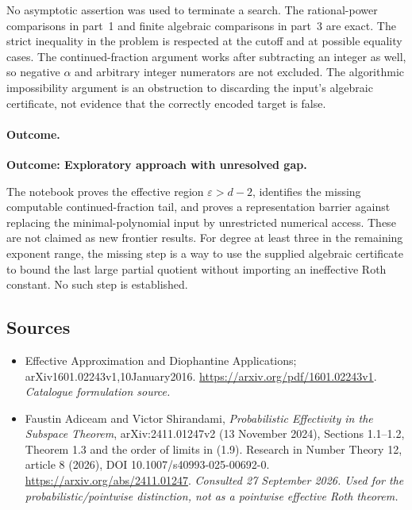 \documentclass[11pt,a4paper]{article}
\newcommand{\eps}{\varepsilon}
\begin{document}
No asymptotic assertion was used to terminate a search. The rational-power
comparisons in part~1 and finite algebraic comparisons in part~3 are exact.
The strict inequality in the problem is respected at the cutoff and at
possible equality cases. The continued-fraction argument works after
subtracting an integer as well, so negative $\alpha$ and arbitrary integer
numerators are not excluded. The algorithmic impossibility argument is an
obstruction to discarding the input's algebraic certificate, not evidence
that the correctly encoded target is false.

\paragraph{Outcome.}
\textbf{Outcome: Exploratory approach with unresolved gap.}

The notebook proves the effective region $\eps>d-2$, identifies the missing
computable continued-fraction tail, and proves a representation barrier
against replacing the minimal-polynomial input by unrestricted numerical
access. These are not claimed as new frontier results. For degree at least
three in the remaining exponent range, the missing step is a way to use
the supplied algebraic certificate to bound the last large partial quotient
without importing an ineffective Roth constant. No such step is established.
\subsection{Sources}
\begin{itemize}\raggedright
\item[\textnormal{[S1]}]\hypertarget{source:208:1}{} Effective Approximation and Diophantine Applications; arXiv1601.02243v1,10January2016.
\url{https://arxiv.org/pdf/1601.02243v1}.
{\small\textit{Catalogue formulation source.}}
\item[\textnormal{[E1]}]\hypertarget{extra:208:1}{} Faustin Adiceam and Victor Shirandami,
\emph{Probabilistic Effectivity in the Subspace Theorem},
arXiv:2411.01247v2 (13 November 2024), Sections 1.1--1.2, Theorem 1.3
and the order of limits in (1.9). Research in Number Theory 12, article 8 (2026),
DOI 10.1007/s40993-025-00692-0.
\url{https://arxiv.org/abs/2411.01247}.
{\small\textit{Consulted 27 September 2026. Used for the probabilistic/pointwise distinction, not as a pointwise effective Roth theorem.}}
\end{itemize}
\end{document}
